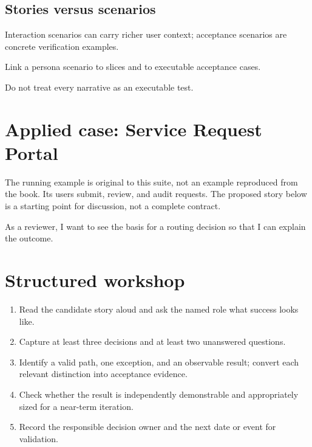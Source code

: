 \documentclass[11pt,letterpaper]{article}
\begin{document}
\subsection{Stories versus scenarios}
Interaction scenarios can carry richer user context; acceptance scenarios are concrete verification examples.

\begin{tcolorbox}[colback=tealback,colframe=navy,title={Engineering translation},breakable]
Link a persona scenario to slices and to executable acceptance cases.

\end{tcolorbox}
\begin{tcolorbox}[colback=amberback,colframe=navy,title={Failure mode to watch},breakable]
Do not treat every narrative as an executable test.

\end{tcolorbox}
\section{Applied case: Service Request Portal}
The running example is original to this suite, not an example reproduced from the book. Its users submit, review, and audit requests. The proposed story below is a starting point for discussion, not a complete contract.

\begin{tcolorbox}[colback=blueback,colframe=navy,title={Candidate story},breakable]
As a reviewer, I want to see the basis for a routing decision so that I can explain the outcome.

\end{tcolorbox}
\section{Structured workshop}
\begin{enumerate}[leftmargin=*,itemsep=3pt]
\item Read the candidate story aloud and ask the named role what success looks like.
\item Capture at least three decisions and at least two unanswered questions.
\item Identify a valid path, one exception, and an observable result; convert each relevant distinction into acceptance evidence.
\item Check whether the result is independently demonstrable and appropriately sized for a near-term iteration.
\item Record the responsible decision owner and the next date or event for validation.
\end{enumerate}
\end{document}

